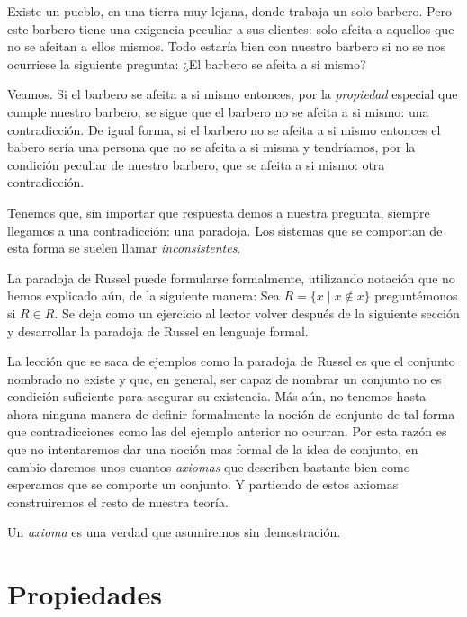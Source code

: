 \begin{ejem}
	Existe un pueblo, en una tierra muy lejana, donde trabaja un solo barbero. Pero este barbero tiene una exigencia peculiar a sus clientes: solo afeita a aquellos que no se afeitan a ellos mismos. Todo estaría bien con nuestro barbero si no se nos ocurriese la siguiente pregunta: ¿El barbero se afeita a si mismo?
	
	Veamos. Si el barbero se afeita a si mismo entonces, por la \textit{propiedad} especial que cumple nuestro barbero, se sigue que el barbero no se afeita a si mismo: una contradicción. De igual forma, si el barbero no se afeita a si mismo entonces el babero sería una persona que no se afeita a si misma y tendríamos, por la condición peculiar de nuestro barbero, que se afeita a si mismo: otra contradicción.
	 		
	Tenemos que, sin importar que respuesta demos a nuestra pregunta, siempre llegamos a una contradicción: una paradoja. Los sistemas que se comportan de esta forma se suelen llamar \textit{inconsistentes}.
	
	La paradoja de Russel puede formularse formalmente, utilizando notación que no hemos explicado aún, de la siguiente manera: Sea $R = \{ x \mid x \notin x \}$ preguntémonos si $R\in R$. Se deja como un ejercicio al lector volver después de la siguiente sección y desarrollar la paradoja de Russel en lenguaje formal.
\end{ejem}
La lección que se saca de ejemplos como la paradoja de Russel es que el conjunto nombrado no existe y que, en general, ser capaz de nombrar un conjunto no es condición suficiente para asegurar su existencia. Más aún, no tenemos hasta ahora ninguna manera de definir formalmente la noción de conjunto de tal forma que contradicciones como las del ejemplo anterior no ocurran. Por esta razón es que no intentaremos dar una noción mas formal de la idea de conjunto, en cambio daremos unos cuantos \textit{axiomas} que describen bastante bien como esperamos que se comporte un conjunto. Y partiendo de estos axiomas construiremos el resto de nuestra teoría.

Un \textit{axioma} es una verdad que asumiremos sin demostración.

\section{Propiedades}

